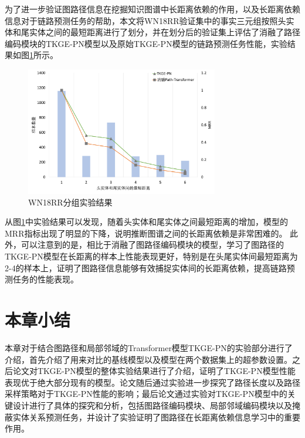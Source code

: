 为了进一步验证图路径信息在挖掘知识图谱中长距离依赖的作用，以及长距离依赖信息对于链路预测任务的帮助，本文将WN18RR验证集中的事实三元组按照头实体和尾实体之间的最短距离进行了划分，并在划分后的验证集上评估了消融了路径编码模块的TKGE-PN模型以及原始TKGE-PN模型的链路预测任务性能，实验结果如图\ref{tkge_experiment}所示。

\begin{figure}[htb]
    \centerline{\includegraphics[width=0.75\textwidth]{pic/TKGE-PN_experiment.pdf}}
    \caption{WN18RR分组实验结果}
    \label{tkge_experiment}
  \end{figure}

从图\ref{tkge_experiment}中实验结果可以发现，随着头实体和尾实体之间最短距离的增加，模型的MRR指标出现了明显的下降，说明推断图谱之间的长距离依赖是非常困难的。 此外，可以注意到的是，相比于消融了图路径编码模块的模型，学习了图路径的TKGE-PN模型在长距离的样本上性能表现更好，特别是在头尾实体间最短距离为2-4的样本上，证明了图路径信息能够有效捕捉实体间的长距离依赖，提高链路预测任务的性能表现。

\section{本章小结}

本章对于结合图路径和局部邻域的Transformer模型TKGE-PN的实验部分进行了介绍，首先介绍了用来对比的基线模型以及模型在两个数据集上的超参数设置。之后论文对TKGE-PN模型的整体实验结果进行了介绍，证明了TKGE-PN模型性能表现优于绝大部分现有的模型。论文随后通过实验进一步探究了路径长度以及路径采样策略对于TKGE-PN性能的影响；最后论文通过实验对TKGE-PN模型中的关键设计进行了具体的探究和分析，包括图路径编码模块、局部邻域编码模块以及掩蔽实体关系预测任务，并设计了实验证明了图路径在长距离依赖信息学习中的重要作用。